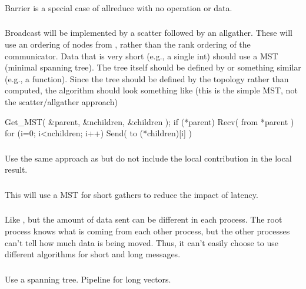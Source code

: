 \documentclass{article}
\begin{document}
\subsubsection{}
Barrier is a special case of allreduce with no operation or data.

\subsubsection{}
Broadcast will be implemented by a scatter followed by an allgather.  These
will use an ordering of nodes from , rather than
the rank ordering of the communicator.
Data that is very short (e.g., a single int) should use a MST (minimal
spanning tree).  The tree itself should be defined by
 or something similar (e.g., a
 function).  
Since the tree should be defined by the topology rather than computed, the
algorithm should look something like (this is the simple MST, not the
scatter/allgather approach)
\begin{algorithm}
Get_MST( \&parent, \&nchildren, \&children );
if (*parent) 
    Recv( from *parent )
for (i=0; i<nchildren; i++)
    Send( to (*children)[i] )
\end{algorithm}

\subsubsection{}
Use the same approach as  but do not include the local
contribution in the local result.

\subsubsection{}
This will use a MST for short gathers to reduce the impact of latency.  

\subsubsection{}
Like , but the amount of data sent can be different in
each process.  The root process knows what is coming from each other process,
but the other processes can't tell how much data is being moved.  Thus, it
can't easily choose to use different algorithms for short and long messages.  

\subsubsection{}
Use a spanning tree.  Pipeline for long vectors.
\end{document}
